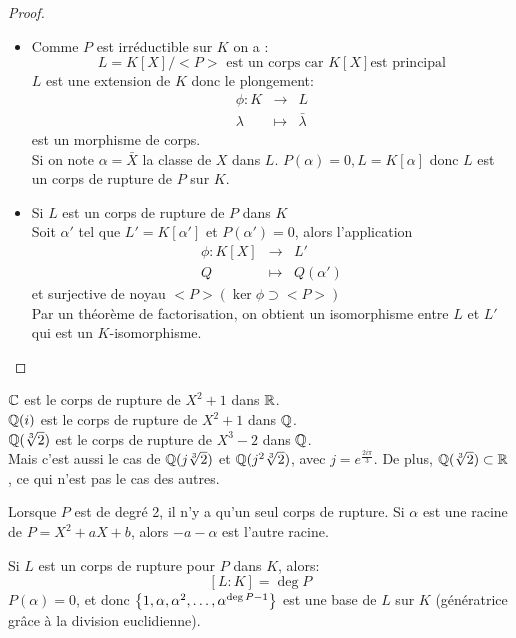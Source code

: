 \begin{proof}

	\begin{itemize}
		\item Comme $P$ est irréductible sur $K$ on a :
		      $$ L = K[X]/<P> \text{ est un corps car } K[X] \text{est principal}$$
		      $L$ est une extension de $K$ donc le plongement:
		      \begin{eqnarray*}
			      \phi: K &\to& L\\
			      \lambda   &\mapsto &\bar{\lambda}
		      \end{eqnarray*}
		      est un morphisme de corps.\\
		      Si on note $\alpha = \bar{X}$ la classe de $X$ dans $L$. $P(\alpha) = 0, L = K[\alpha]$
		      donc $L$ est un corps de rupture de $P$ sur $K$.
		\item Si $L$ est un corps de rupture de $P$ dans $K$ \\
		      Soit $\alpha'$ tel que $L' = K[\alpha']$ et $P(\alpha') = 0$, alors l'application
		      \begin{eqnarray*}
			      \phi : K[X] &\to& L'\\
			      Q &   \mapsto & Q(\alpha')
		      \end{eqnarray*}
		      et surjective de noyau $<P> (\ker \phi \supset <P>)$\\
		      Par un théorème de factorisation, on obtient un isomorphisme entre $L$ et $L'$ qui est un $K$-isomorphisme.
	\end{itemize}
\end{proof}

\begin{example}
	$\mathbb{C}$ est le corps de rupture de $X^2+1$ dans $\mathbb{R}$.\\
	$\mathbb{Q}(i)$ est le corps de rupture de $X^2+1$ dans $\mathbb{Q}$.\\
	$\mathbb{Q}(\sqrt[3]{2})$ est le corps de rupture de $X^3-2$ dans $\mathbb{Q}$.\\
	Mais c'est aussi le cas de $\mathbb{Q}(j\sqrt[3]{2})$ et $\mathbb{Q}(j^2\sqrt[3]{2})$, avec $j = e^{\frac{2i\pi}{3}}$.
	De plus, $\mathbb{Q}(\sqrt[3]{2}) \subset \mathbb{R}$, ce qui n'est pas le cas des autres.

	Lorsque $P$ est de degré 2, il n'y a qu'un seul corps de rupture. Si $\alpha$ est une racine de $P = X^2 + aX + b$,
	alors $-a-\alpha$ est l'autre racine.
\end{example}

\begin{remarque}[Important]
	Si $L$ est un corps de rupture pour $P$ dans $K$, alors:
	$$ [L : K] = \deg P$$
	$P(\alpha) = 0$, et donc $\left\{1, \alpha, \alpha^2, \ldots, \alpha^{\deg P -1}\right\}$ est une base de $L$ sur $K$ (génératrice grâce à la division euclidienne).
\end{remarque}


